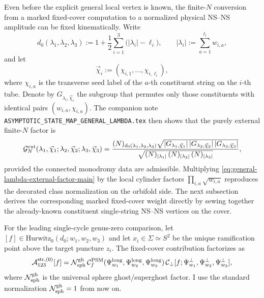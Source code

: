 \documentclass[11pt]{article}
\newcommand{\mc}[1]{\mathcal{#1}}
\begin{document}
Even before the explicit general local vertex is known, the finite-$N$ conversion from a marked fixed-cover computation to a normalized physical NS--NS amplitude can be fixed kinematically. Write
\begin{equation}\label{eq:general-lambda-degree-main}
d_0(\lambda_1,\lambda_2,\lambda_3)
:=
1+\frac12\sum_{i=1}^3 \bigl(|\lambda_i|-\ell_i\bigr),
\qquad
|\lambda_i|:=\sum_{a=1}^{\ell_i} w_{i,a},
\end{equation}
and let
\[
\vec\chi_i:=(\chi_{i,1},\dots,\chi_{i,\ell_i}),
\]
where $\chi_{i,a}$ is the transverse seed label of the $a$-th constituent string on the $i$-th tube. Denote by $G_{\lambda_i,\vec\chi_i}$ the subgroup that permutes only those constituents with identical pairs $(w_{i,a},\chi_{i,a})$. The companion note \texttt{ASYMPTOTIC\_STATE\_MAP\_GENERAL\_LAMBDA.tex} then shows that the purely external finite-$N$ factor is
\begin{equation}\label{eq:general-lambda-external-factor-main}
\mc G_N^{\rm ext}(\lambda_1,\vec\chi_1;\lambda_2,\vec\chi_2;\lambda_3,\vec\chi_3)
=
\frac{(N)_{d_0(\lambda_1,\lambda_2,\lambda_3)}
\sqrt{
|G_{\lambda_1,\vec\chi_1}|\,
|G_{\lambda_2,\vec\chi_2}|\,
|G_{\lambda_3,\vec\chi_3}|
}}{
\sqrt{
(N)_{|\lambda_1|}\,
(N)_{|\lambda_2|}\,
(N)_{|\lambda_3|}
}},
\end{equation}
provided the connected monodromy data are admissible. Multiplying \eqref{eq:general-lambda-external-factor-main} by the local cylinder factors $\prod_{i,a}\sqrt{w_{i,a}}$ reproduces the decorated class normalization on the orbifold side. The next subsection derives the corresponding marked fixed-cover weight directly by sewing together the already-known constituent single-string NS--NS vertices on the cover.

For the leading single-cycle genus-zero comparison, let $[f]\in \mathrm{Hurwitz}_0(d_0;w_1,w_2,w_3)$ and let $x_i\in \Sigma\simeq S^2$ be the unique ramification point above the target puncture $z_i$. The fixed-cover contribution factorizes as
\begin{equation}\label{eq:fixed-cover-psm-factorization}
\mc A^{\rm str,(0)}_{123}[f]
=
\mc N^{\rm gh}_{\mathrm{sph}}\,
\mc C_f^{\rm PSM}(\Psi_{w_1}^{\rm long},\Psi_{w_2}^{\rm long},\Psi_{w_3}^{\rm long})\,
\mc C_\perp[f;\Psi_{w_1}^\perp,\Psi_{w_2}^\perp,\Psi_{w_3}^\perp],
\end{equation}
where $\mc N^{\rm gh}_{\mathrm{sph}}$ is the universal sphere ghost/superghost factor. I use the standard normalization $\mc N^{\rm gh}_{\mathrm{sph}}=1$ from now on.
\end{document}
